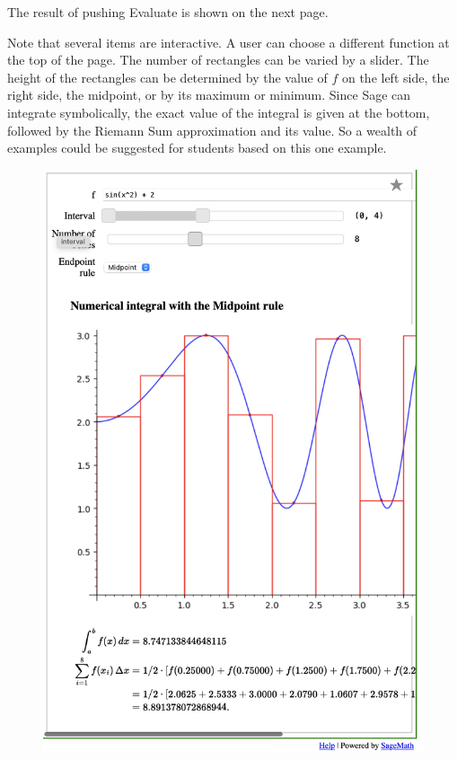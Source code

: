 \documentclass[11pt, oneside]{article}   	%
\begin{document}
The result of pushing Evaluate is shown on the next page. 

Note that several items are interactive. A user can choose a different function at the top of the page. 
The number of rectangles can be varied by a slider. The height of the rectangles can be determined by the value of $f$ on the left side, the right side, the midpoint, or by its maximum or minimum. Since Sage can integrate symbolically, the exact value of the integral is given at the bottom, followed by the Riemann Sum approximation and its value. So a wealth of examples could be suggested for students  based on this one example.

\newpage
\begin{figure}[H] %
     \hspace{.2in}  \includegraphics[width=5in.]{Graphics/shot10.png} %
\end{figure}
\end{document}
